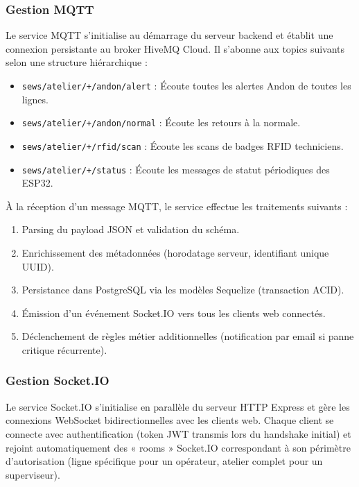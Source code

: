 \subsubsection{Gestion MQTT}

Le service MQTT s'initialise au démarrage du serveur backend et établit une connexion persistante au broker HiveMQ Cloud. Il s'abonne aux topics suivants selon une structure hiérarchique :

\begin{itemize}
    \item \texttt{sews/atelier/+/andon/alert} : Écoute toutes les alertes Andon de toutes les lignes.
    \item \texttt{sews/atelier/+/andon/normal} : Écoute les retours à la normale.
    \item \texttt{sews/atelier/+/rfid/scan} : Écoute les scans de badges RFID techniciens.
    \item \texttt{sews/atelier/+/status} : Écoute les messages de statut périodiques des ESP32.
\end{itemize}

À la réception d'un message MQTT, le service effectue les traitements suivants :

\begin{enumerate}
    \item Parsing du payload JSON et validation du schéma.
    \item Enrichissement des métadonnées (horodatage serveur, identifiant unique UUID).
    \item Persistance dans PostgreSQL via les modèles Sequelize (transaction ACID).
    \item Émission d'un événement Socket.IO vers tous les clients web connectés.
    \item Déclenchement de règles métier additionnelles (notification par email si panne critique récurrente).
\end{enumerate}


\subsubsection{Gestion Socket.IO}

Le service Socket.IO s'initialise en parallèle du serveur HTTP Express et gère les connexions WebSocket bidirectionnelles avec les clients web. Chaque client se connecte avec authentification (token JWT transmis lors du handshake initial) et rejoint automatiquement des « rooms » Socket.IO correspondant à son périmètre d'autorisation (ligne spécifique pour un opérateur, atelier complet pour un superviseur).

